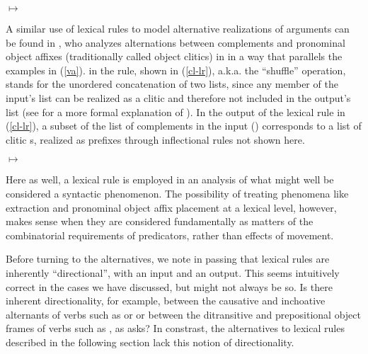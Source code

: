 \documentclass[output=paper
 	        ,biblatex
                ,babelshorthands
                ,newtxmath
                ,draftmode
                ,colorlinks, citecolor=brown
]{langscibook}
\begin{document}
\begin{exe}
	\ex\label{celr}
	$\mapsto$
\end{exe}


A similar use of lexical rules to model alternative realizations of arguments can be found in ,  who analyzes alternations between complements and pronominal object affixes (traditionally called object clitics) in  in a way that parallels the  examples in (\ref{va}). \shuffle\is{$\bigcirc$} in the rule, shown in (\ref{cl-lr}), a.k.a. the ``shuffle'' operation, stands for the unordered concatenation of two lists, since any member of the input's  list can be realized as a clitic and therefore not included in the output's  list (see  for a more formal explanation of \shuffle). In the output of the lexical rule in (\ref{cl-lr}), a subset of the list of complements in the input () corresponds to a list of clitic s, realized as prefixes through inflectional rules not shown here. 

\begin{exe}
	\ex\label{cl-lr}
	$\mapsto$
\end{exe}

Here as well, a lexical rule is employed in an analysis of what might well be considered a syntactic phenomenon.
The possibility of treating phenomena like extraction and pronominal object affix placement at a lexical level, however, makes sense when they are considered fundamentally as matters of the combinatorial requirements of predicators, rather than effects of movement.

Before turning to the alternatives, we note in passing that lexical rules are inherently ``directional'', with an input and an output.
This seems intuitively correct in the cases we have discussed, but might not always be so.
Is there inherent directionality, for example, between the causative and inchoative alternants of verbs such as  or  or between the ditransitive and prepositional object frames of verbs such as , as \citet{Goldberg1995} asks?
In constrast, the alternatives to lexical rules described in the following section lack this notion of directionality.
\end{document}
